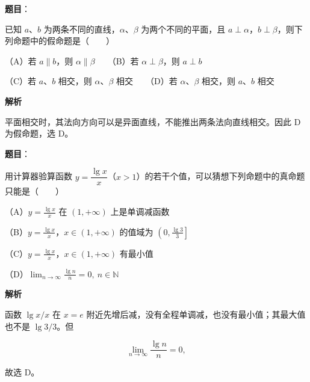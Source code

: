 \begin{answer}

\textbf{题目}：

已知 $a$、$b$ 为两条不同的直线，$\alpha$、$\beta$ 为两个不同的平面，且 $a\perp\alpha$，$b\perp\beta$，则下列命题中的假命题是\mbox{（　　）}

（A）若 $a\parallel b$，则 $\alpha\parallel\beta$　　（B）若 $\alpha\perp\beta$，则 $a\perp b$

（C）若 $a$、$b$ 相交，则 $\alpha$、$\beta$ 相交　　（D）若 $\alpha$、$\beta$ 相交，则 $a$、$b$ 相交

\textbf{解析}

平面相交时，其法向方向可以是异面直线，不能推出两条法向直线相交。因此 D 为假命题，选 D。


\end{answer}
\begin{answer}

\textbf{题目}：

用计算器验算函数 $y=\dfrac{\lg x}{x}$（$x>1$）的若干个值，可以猜想下列命题中的真命题只能是\mbox{（　　）}

（A）$y=\frac{\lg x}{x}$ 在 $(1,+\infty)$ 上是单调减函数

（B）$y=\frac{\lg x}{x}$，$x\in(1,+\infty)$ 的值域为 $\left(0,\frac{\lg3}{3}\right]$

（C）$y=\frac{\lg x}{x}$，$x\in(1,+\infty)$ 有最小值

（D）$\displaystyle\lim_{n\to\infty}\frac{\lg n}{n}=0,\ n\in\mathbb N$

\textbf{解析}

函数 $\lg x/x$ 在 $x=e$ 附近先增后减，没有全程单调减，也没有最小值；其最大值也不是 $\lg3/3$。但

\nopagebreak[4]
\[
\lim_{n\to\infty}\frac{\lg n}{n}=0,
\]

故选 D。


\end{answer}

